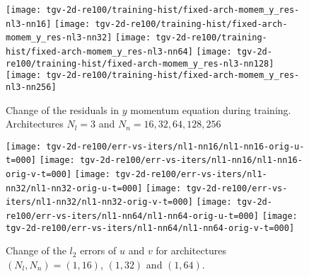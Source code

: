 \begin{figure}[H]
    \centering
        \texttt{[image: tgv-2d-re100/training-hist/fixed-arch-momem\_y\_res-nl3-nn16]}%
    \hfill
        \texttt{[image: tgv-2d-re100/training-hist/fixed-arch-momem\_y\_res-nl3-nn32]}%
    \hfill
        \texttt{[image: tgv-2d-re100/training-hist/fixed-arch-momem\_y\_res-nl3-nn64]}%
    \hfill
        \texttt{[image: tgv-2d-re100/training-hist/fixed-arch-momem\_y\_res-nl3-nn128]}%
    \newline
        \texttt{[image: tgv-2d-re100/training-hist/fixed-arch-momem\_y\_res-nl3-nn256]}%
    \caption{Change of the residuals in $y$ momentum equation during training. Architectures $N_l=3$ and $N_n=16,32,64,128,256$}
\end{figure}

\begin{figure}[H]
    \centering
    \texttt{[image: tgv-2d-re100/err-vs-iters/nl1-nn16/nl1-nn16-orig-u-t=000]}%
    \hfill%
    \texttt{[image: tgv-2d-re100/err-vs-iters/nl1-nn16/nl1-nn16-orig-v-t=000]}%
    \newline
    \vfill
    \texttt{[image: tgv-2d-re100/err-vs-iters/nl1-nn32/nl1-nn32-orig-u-t=000]}%
    \hfill
    \texttt{[image: tgv-2d-re100/err-vs-iters/nl1-nn32/nl1-nn32-orig-v-t=000]}%
    \newline
    \vfill
    \texttt{[image: tgv-2d-re100/err-vs-iters/nl1-nn64/nl1-nn64-orig-u-t=000]}%
    \hfill
    \texttt{[image: tgv-2d-re100/err-vs-iters/nl1-nn64/nl1-nn64-orig-v-t=000]}%
    \caption{Change of the $l_2$ errors of $u$ and $v$ for architectures $(N_l, N_n)=(1, 16)$, $(1, 32)$ and $(1, 64)$.}
\end{figure}

